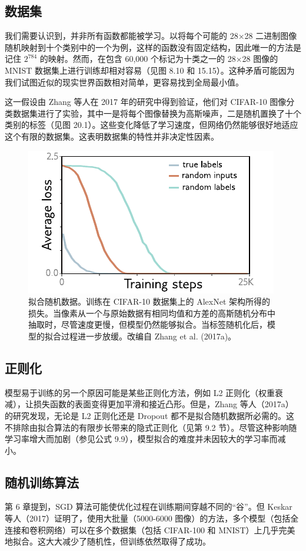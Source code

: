 \documentclass[lang=cn,newtx,10pt,scheme=chinese]{elegantbook}
\begin{document}
\subsection{数据集}
我们需要认识到，并非所有函数都能被学习。以将每个可能的 28×28 二进制图像随机映射到十个类别中的一个为例，这样的函数没有固定结构，因此唯一的方法是记住 \(2^784\) 的映射。然而，在包含 60,000 个标记为十类之一的 28×28 图像的 MNIST 数据集上进行训练却相对容易（见图 8.10 和 15.15）。这种矛盾可能因为我们试图近似的现实世界函数相对简单，更容易找到全局最小值。

这一假设由 Zhang 等人在 2017 年的研究中得到验证，他们对 CIFAR-10 图像分类数据集进行了实验，其中一是将每个图像替换为高斯噪声，二是随机置换了十个类别的标签（见图 20.1）。这些变化降低了学习速度，但网络仍然能够很好地适应这个有限的数据集。这表明数据集的特性并非决定性因素。

\begin{figure}[ht!]
\centering
\includegraphics[width=0.7\linewidth]{PDFFigures/UDLChap21PDF/WhyZhangResults.pdf}
\caption{拟合随机数据。训练在 CIFAR-10 数据集上的 AlexNet 架构所得的损失。当像素从一个与原始数据有相同均值和方差的高斯随机分布中抽取时，尽管速度更慢，但模型仍然能够拟合。当标签随机化后，模型的拟合过程进一步放缓。改编自 Zhang et al. (2017a)。}
\end{figure}

\subsection{正则化}
模型易于训练的另一个原因可能是某些正则化方法，例如 L2 正则化（权重衰减），让损失函数的表面变得更加平滑和接近凸形。但是，Zhang 等人（2017a）的研究发现，无论是 L2 正则化还是 Dropout 都不是拟合随机数据所必需的。这不排除由拟合算法的有限步长带来的隐式正则化（见第 9.2 节）。尽管这种影响随学习率增大而加剧（参见公式 9.9），模型拟合的难度并未因较大的学习率而减小。

\subsection{随机训练算法}
第 6 章提到，SGD 算法可能使优化过程在训练期间穿越不同的“谷”。但 Keskar 等人（2017）证明了，使用大批量（5000-6000 图像）的方法，多个模型（包括全连接和卷积网络）可以在多个数据集（包括 CIFAR-100 和 MNIST）上几乎完美地拟合。这大大减少了随机性，但训练依然取得了成功。
\end{document}

